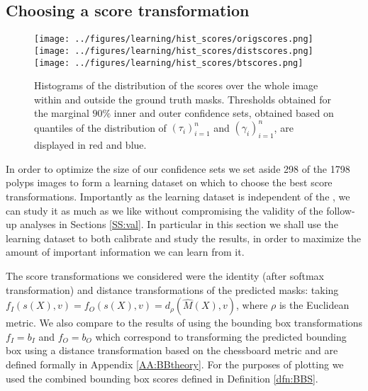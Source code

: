 \subsection{Choosing a score transformation}\label{SS:learn}
\begin{figure}
	\centering
	\texttt{[image: ../figures/learning/hist\_scores/origscores.png]}
	\texttt{[image: ../figures/learning/hist\_scores/distscores.png]}
	\texttt{[image: ../figures/learning/hist\_scores/btscores.png]}
	\caption{Histograms of the distribution of the scores over the whole image within and outside the ground truth masks. Thresholds obtained for the marginal $90\%$ inner and outer confidence sets, obtained based on quantiles of the distribution of $(\tau_i)_{i = 1}^n$ and $(\gamma_i)_{i = 1}^n$, are displayed in red and blue.}
	\label{scorehists}
\end{figure}
In order to optimize the size of our confidence sets we set aside 298 of the 1798 polyps images to form a learning dataset on which to choose the best score transformations. Importantly as the learning dataset is independent of the , we can study it as much as we like without compromising the validity of the follow-up analyses in Sections \ref{SS:val}. In particular in this section we shall use the learning dataset to both calibrate and study the results, in order to maximize the amount of important information we can learn from it.

The score transformations we considered were the identity (after softmax transformation) and distance transformations of the predicted masks:  taking $f_I(s(X), v) = f_O(s(X), v) = d_\rho(\hat{M}(X), v)$, where $\rho$ is the Euclidean metric. We also compare to the results of using the bounding box transformations $f_I = b_I$ and $f_O = b_O$ which correspond to transforming the predicted bounding box using a distance transformation based on the chessboard metric and are defined formally in Appendix \ref{AA:BBtheory}. For the purposes of plotting we used the combined bounding box scores defined in Definition \ref{dfn:BBS}.


